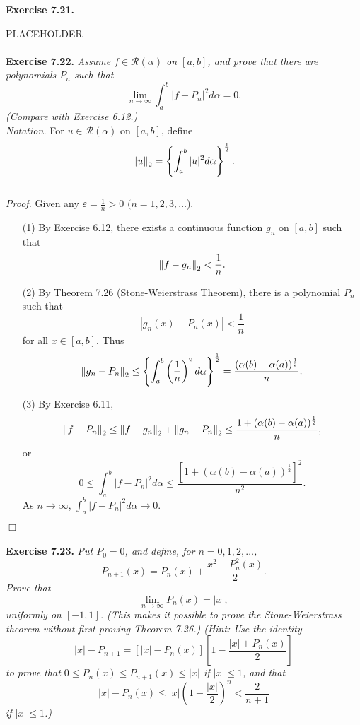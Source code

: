 \documentclass{article}
\begin{document}
\textbf{Exercise 7.21.}

PLACEHOLDER \\\\






\textbf{Exercise 7.22.}
\emph{Assume $f \in \mathscr{R}(\alpha)$ on $[a,b]$,
and prove that there are polynomials $P_n$ such that
\[
  \lim_{n \to \infty} \int_{a}^{b} |f-P_n|^2 d\alpha = 0.
\]
(Compare with Exercise 6.12.)} \\

\emph{Notation.}
For $u \in \mathscr{R}(\alpha)$ on $[a,b]$, define
  \[
    \norm{u}_2 = \left\{ \int_{a}^{b}|u|^2 d\alpha \right\}^{\frac{1}{2}}.
  \] \\

\emph{Proof.}
Given any $\varepsilon = \frac{1}{n} > 0$ $(n=1,2,3,\ldots$).
\begin{enumerate}
\item[(1)]
  By Exercise 6.12, there exists a continuous function $g_n$ on $[a,b]$
  such that
  \[
    \norm{f-g_n}_2 < \frac{1}{n}.
  \]

\item[(2)]
  By Theorem 7.26 (Stone-Weierstrass Theorem),
  there is a polynomial $P_n$ such that
  \[
    |g_n(x)-P_n(x)| < \frac{1}{n}
  \]
  for all $x \in [a,b]$.
  Thus
  \[
    \norm{g_n-P_n}_2
    \leq
    \left\{ \int_{a}^{b}\left(\frac{1}{n}\right)^2 d\alpha \right\}^{\frac{1}{2}}
    =
    \frac{(\alpha(b)-\alpha(a))^{\frac{1}{2}}}{n}.
  \]

\item[(3)]
  By Exercise 6.11,
  \[
    \norm{f-P_n}_2
    \leq
    \norm{f-g_n}_2 + \norm{g_n-P_n}_2
    \leq
    \frac{1+(\alpha(b)-\alpha(a))^{\frac{1}{2}}}{n},
  \]
  or
  \[
    0
    \leq
    \int_{a}^{b} |f-P_n|^2 d\alpha
    \leq
    \frac{[1+(\alpha(b)-\alpha(a))^{\frac{1}{2}}]^2}{n^2}.
  \]
  As $n \to \infty$, $\int_{a}^{b} |f-P_n|^2 d\alpha \to 0$.
\end{enumerate}
$\Box$ \\\\






\textbf{Exercise 7.23.}
\emph{Put $P_0 = 0$, and define, for $n = 0,1,2,\ldots$,
\[
  P_{n+1}(x) = P_n(x) + \frac{x^2-P_n^2(x)}{2}.
\]
Prove that
\[
  \lim_{n \to \infty} P_n(x) = |x|,
\]
uniformly on $[-1,1]$.
(This makes it possible to prove the Stone-Weierstrass theorem without
first proving Theorem 7.26.)
(Hint: Use the identity
\[
  |x| - P_{n+1} = [|x| - P_n(x)]\left[1-\frac{|x|+P_n(x)}{2}\right]
\]
to prove that $0 \leq P_n(x) \leq P_{n+1}(x) \leq |x|$ if $|x| \leq 1$, and that
\[
  |x| - P_n(x) \leq |x| \left(1-\frac{|x|}{2}\right)^n < \frac{2}{n+1}
\]
if $|x| \leq 1$.)} \\
\end{document}
